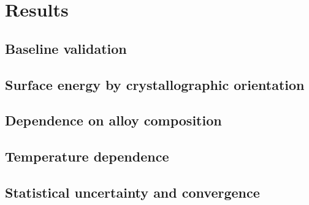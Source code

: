 \chapter{Results}

\section{Baseline validation}
\section{Surface energy by crystallographic orientation}
\section{Dependence on alloy composition}
\section{Temperature dependence}
\section{Statistical uncertainty and convergence}